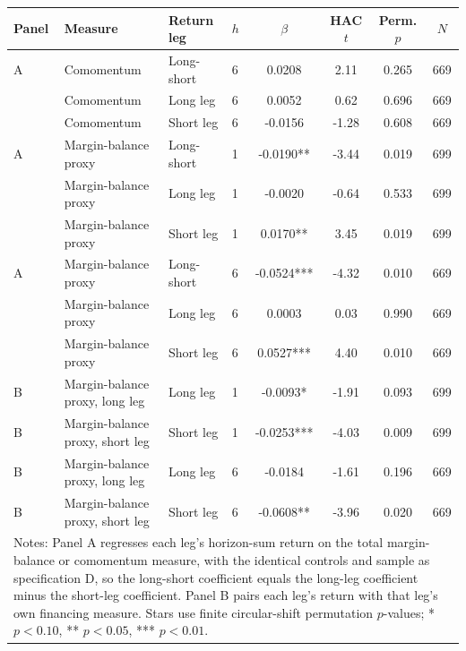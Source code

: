 \begingroup\footnotesize\setlength{\tabcolsep}{2pt}
\begin{tabular}{llllcccc}
\toprule
Panel & Measure & Return leg & $h$ & $\beta$ & HAC $t$ & Perm. $p$ & $N$ \\
\midrule
A & Comomentum & Long-short & 6 & 0.0208 & 2.11 & 0.265 & 669 \\
 & Comomentum & Long leg & 6 & 0.0052 & 0.62 & 0.696 & 669 \\
 & Comomentum & Short leg & 6 & -0.0156 & -1.28 & 0.608 & 669 \\
A & Margin-balance proxy & Long-short & 1 & -0.0190** & -3.44 & 0.019 & 699 \\
 & Margin-balance proxy & Long leg & 1 & -0.0020 & -0.64 & 0.533 & 699 \\
 & Margin-balance proxy & Short leg & 1 & 0.0170** & 3.45 & 0.019 & 699 \\
A & Margin-balance proxy & Long-short & 6 & -0.0524*** & -4.32 & 0.010 & 669 \\
 & Margin-balance proxy & Long leg & 6 & 0.0003 & 0.03 & 0.990 & 669 \\
 & Margin-balance proxy & Short leg & 6 & 0.0527*** & 4.40 & 0.010 & 669 \\
\midrule
B & Margin-balance proxy, long leg & Long leg & 1 & -0.0093* & -1.91 & 0.093 & 699 \\
B & Margin-balance proxy, short leg & Short leg & 1 & -0.0253*** & -4.03 & 0.009 & 699 \\
B & Margin-balance proxy, long leg & Long leg & 6 & -0.0184 & -1.61 & 0.196 & 669 \\
B & Margin-balance proxy, short leg & Short leg & 6 & -0.0608** & -3.96 & 0.020 & 669 \\
\midrule
\multicolumn{8}{l}{\parbox{\dimexpr\textwidth-10pt\relax}{\footnotesize Notes: Panel A regresses each leg's horizon-sum return on the total margin-balance or comomentum measure, with the identical controls and sample as specification D, so the long-short coefficient equals the long-leg coefficient minus the short-leg coefficient. Panel B pairs each leg's return with that leg's own financing measure. Stars use finite circular-shift permutation $p$-values; * $p<0.10$, ** $p<0.05$, *** $p<0.01$.}} \\
\bottomrule
\end{tabular}

\endgroup